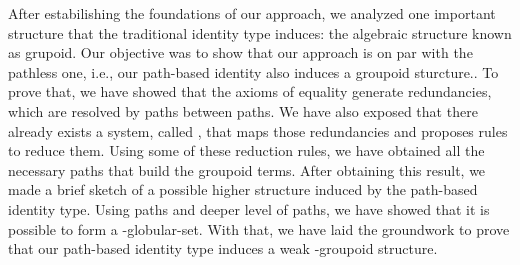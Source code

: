 \documentclass{entcs} \usepackage{entcsmacro}
\begin{document}
After estabilishing the foundations of our approach, we analyzed one important structure that the traditional identity type induces: the algebraic structure known as grupoid. Our objective was to show that our approach is on par with the pathless one, i.e., our path-based identity also induces a groupoid sturcture.. To prove that, we have showed that the axioms of equality generate redundancies, which are resolved by paths between paths. We have also exposed that there already exists a system, called , that maps those redundancies and proposes rules to reduce them. Using some of these reduction rules, we have obtained all the necessary paths that build the groupoid terms. After obtaining this result, we made a brief sketch of a possible higher structure induced by the path-based identity type. Using paths and deeper level of paths, we have showed that it is possible to form a -globular-set. With that, we have laid the groundwork to prove that our path-based identity type induces a weak -groupoid structure.



\end{document}
